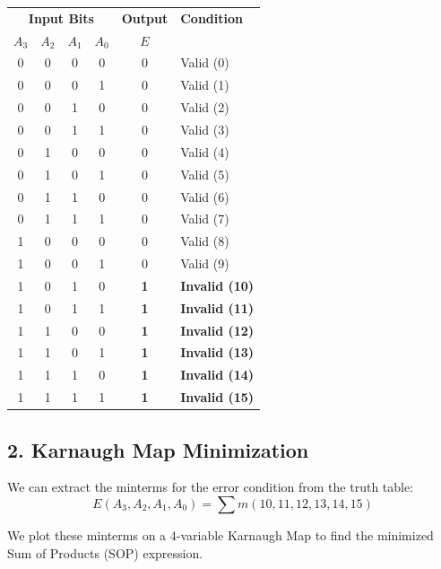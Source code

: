 \documentclass[12pt,a3paper]{article}
\begin{document}
\begin{enumerate}
\begin{tcolorbox}[enhanced,breakable,ansbox,colback=cD!4,colframe=cD,boxrule=0.8pt,arc=5pt,title={\textbf{Answer}},fonttitle=\bfseries\color{white},colbacktitle=cD]
\begin{center}
\renewcommand{\arraystretch}{1.1}
\begin{tabular}{cccc | c | l}
\toprule
\multicolumn{4}{c|}{\textbf{Input Bits}} & \textbf{Output} & \textbf{Condition} \\
$A_3$ & $A_2$ & $A_1$ & $A_0$ & $E$ & \\
\midrule
0 & 0 & 0 & 0 & 0 & Valid (0) \\
0 & 0 & 0 & 1 & 0 & Valid (1) \\
0 & 0 & 1 & 0 & 0 & Valid (2) \\
0 & 0 & 1 & 1 & 0 & Valid (3) \\
0 & 1 & 0 & 0 & 0 & Valid (4) \\
0 & 1 & 0 & 1 & 0 & Valid (5) \\
0 & 1 & 1 & 0 & 0 & Valid (6) \\
0 & 1 & 1 & 1 & 0 & Valid (7) \\
1 & 0 & 0 & 0 & 0 & Valid (8) \\
1 & 0 & 0 & 1 & 0 & Valid (9) \\
\midrule
1 & 0 & 1 & 0 & \textcolor{cD}{\textbf{1}} & \textcolor{cD}{\textbf{Invalid (10)}} \\
1 & 0 & 1 & 1 & \textcolor{cD}{\textbf{1}} & \textcolor{cD}{\textbf{Invalid (11)}} \\
1 & 1 & 0 & 0 & \textcolor{cD}{\textbf{1}} & \textcolor{cD}{\textbf{Invalid (12)}} \\
1 & 1 & 0 & 1 & \textcolor{cD}{\textbf{1}} & \textcolor{cD}{\textbf{Invalid (13)}} \\
1 & 1 & 1 & 0 & \textcolor{cD}{\textbf{1}} & \textcolor{cD}{\textbf{Invalid (14)}} \\
1 & 1 & 1 & 1 & \textcolor{cD}{\textbf{1}} & \textcolor{cD}{\textbf{Invalid (15)}} \\
\bottomrule
\end{tabular}
\end{center}

\vspace{0.2cm}
\subsection*{2. Karnaugh Map Minimization}
We can extract the minterms for the error condition from the truth table:
\[ E(A_3, A_2, A_1, A_0) = \sum m(10, 11, 12, 13, 14, 15) \]

We plot these minterms on a 4-variable Karnaugh Map to find the minimized Sum of Products (SOP) expression.


\end{tcolorbox}
\end{enumerate}
\end{document}
